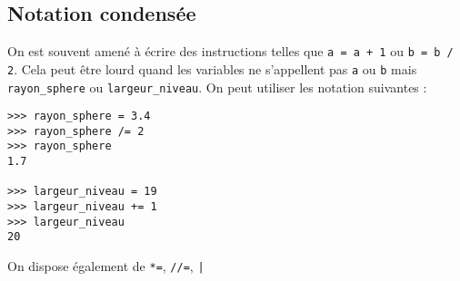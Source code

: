 \subsection{Notation condensée}
On est souvent amené à écrire des instructions telles que  \texttt{a = a + 1} ou \texttt{b = b / 2}. Cela peut être lourd quand les variables ne s'appellent
pas \texttt{a} ou \texttt{b} mais \texttt{rayon_sphere} ou \texttt{largeur_niveau}. On peut utiliser les notation suivantes :
\begin{pys}\begin{verbatim}
>>> rayon_sphere = 3.4
>>> rayon_sphere /= 2
>>> rayon_sphere
1.7

>>> largeur_niveau = 19
>>> largeur_niveau += 1
>>> largeur_niveau
20
\end{verbatim}
\end{pys}

On dispose également de \texttt{*=}, \texttt{//=}, \texttt|%
